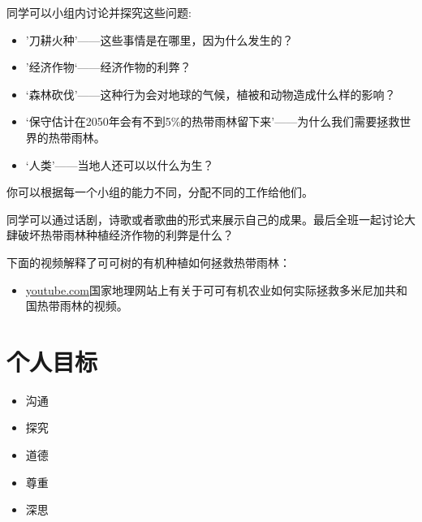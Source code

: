      同学可以小组内讨论并探究这些问题:\par
     \begin{itemize}
       \item '刀耕火种'——这些事情是在哪里，因为什么发生的？
       \item ’经济作物‘——经济作物的利弊？
       \item ‘森林砍伐’——这种行为会对地球的气候，植被和动物造成什么样的影响？
       \item ‘保守估计在2050年会有不到5\%的热带雨林留下来’——为什么我们需要拯救世界的热带雨林。
       \item ‘人类’——当地人还可以以什么为生？
     \end{itemize}  
     你可以根据每一个小组的能力不同，分配不同的工作给他们。\par
     同学可以通过话剧，诗歌或者歌曲的形式来展示自己的成果。最后全班一起讨论大肆破坏热带雨林种植经济作物的利弊是什么？\par
     下面的视频解释了可可树的有机种植如何拯救热带雨林：\par
     \begin{itemize}
       \item \href{http://video.nationalgeographic.com/video/player/news/environment-news/domrep-cacao-wcvin.html}{youtube.com}国家地理网站上有关于可可有机农业如何实际拯救多米尼加共和国热带雨林的视频。
     \end{itemize}  
     
     

     
\section{个人目标}
    \begin{itemize}
      \item 沟通
      \item 探究
      \item 道德
      \item 尊重
      \item 深思
    \end{itemize}  

